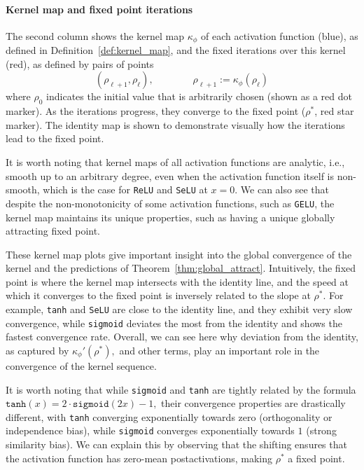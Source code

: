 \documentclass[twoside]{article}
\newcommand{\km}{\kappa_\phi}
\theoremstyle{definition}
\begin{document}
\paragraph{Kernel map and fixed point iterations} The second column shows the kernel map $\km$ of each activation function (blue), as defined in Definition~\ref{def:kernel_map}, and the fixed iterations over this kernel (red), as defined by pairs of points 
$$
(\rho_{\ell+1},\rho_\ell), \qquad \qquad \rho_{\ell+1}:=\km(\rho_\ell)
$$
where $\rho_0$ indicates the initial value that is arbitrarily chosen (shown as a red dot marker). As the iterations progress, they converge to the fixed point ($\rho^*$, red star marker). The identity map is shown to demonstrate visually how the iterations lead to the fixed point.  

It is worth noting that kernel maps of all activation functions are analytic, i.e., smooth up to an arbitrary degree, even when the activation function itself is non-smooth, which is the case for \texttt{ReLU} and \texttt{SeLU} at $x=0.$ We can also see that despite the non-monotonicity of some activation functions, such as \texttt{GELU}, the kernel map maintains its unique properties, such as having a unique globally attracting fixed point. 

These kernel map plots give important insight into the global convergence of the kernel and the predictions of Theorem~\ref{thm:global_attract}. Intuitively, the fixed point is where the kernel map intersects with the identity line, and the speed at which it converges to the fixed point is inversely related to the slope at $\rho^*.$ For example, \texttt{tanh} and \texttt{SeLU} are close to the identity line, and they exhibit very slow convergence, while \texttt{sigmoid} deviates the most from the identity and shows the fastest convergence rate. Overall, we can see here why deviation from the identity, as captured by $\km'(\rho^*),$ and other terms, play an important role in the convergence of the kernel sequence. 

It is worth noting that while \texttt{sigmoid} and \texttt{tanh} are tightly related by the formula $\texttt{tanh}(x) = 2\cdot\texttt{sigmoid}(2x)-1,$ their convergence properties are drastically different, with \texttt{tanh} converging exponentially towards zero (orthogonality or independence bias), while \texttt{sigmoid} converges exponentially towards $1$ (strong similarity bias). We can explain this by observing that the shifting ensures that the activation function has zero-mean postactivations, making $\rho^*$ a fixed point. 
\end{document}
